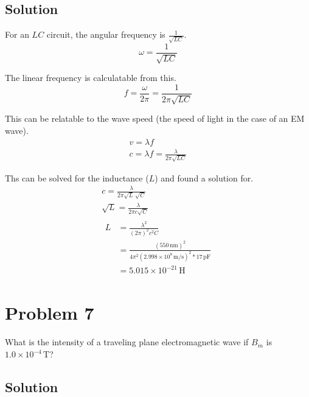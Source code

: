 \documentclass[12pt]{article}
\newcommand{\E}[1]{\times 10^{#1}}
\begin{document}
        \subsection{Solution}
            For an $LC$ circuit, the angular frequency is $\frac{1}{\sqrt{LC}}$.
            \begin{equation}
                \omega  =   \frac{1}{\sqrt{LC}}
            \end{equation}

            The linear frequency is calculatable from this.
            \begin{equation}
                f   =   \frac{\omega}{2\pi}
                    =   \frac{1}{2\pi\sqrt{LC}}
            \end{equation}

            This can be relatable to the wave speed (the speed of light in the case of an EM wave).
            \begin{gather}
                v   =   \lambda f\\
                c   =   \lambda f
                    =   \frac{\lambda}{2\pi\sqrt{LC}}
            \end{gather}

            Ths can be solved for the inductance ($L$) and found a solution for.
            \begin{gather}
                c   =   \frac{\lambda}{2\pi\sqrt{L}\,\sqrt{C}}\\
                \sqrt{L}    =   \frac{\lambda}{2\pi c\sqrt{C}}\\
                \begin{align}
                    L   &=  \frac{\lambda^2}{(2\pi)^2 c^2 C}\\
                        &=  \frac{(550\,\unit{\nano\meter})^2}{4\pi^2 (2.998\E{8}\,\unit{\meter/\second})^2 * 17\,\unit{\pico\farad}}\\
                        &=  \boxed{5.015\E{-21}\,\unit{\henry}}
                \end{align}
            \end{gather}

    \pagebreak
    \section{Problem 7}
        What is the intensity of a traveling plane electromagnetic wave if $B_m$ is $1.0\E{-4}\,\unit{\tesla}$?

        \subsection{Solution}
\end{document}
